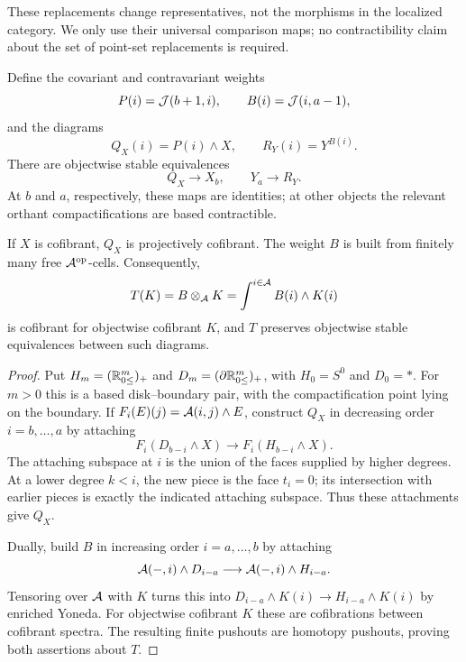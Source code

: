 These replacements change representatives, not the morphisms in the localized category. We only use their universal comparison maps; no contractibility claim about the set of point-set replacements is required.

Define the covariant and contravariant weights
\[
    P(i)=\mathcal{J}(b+1,i),\qquad B(i)=\mathcal{J}(i,a-1),
\]
and the diagrams
\[
    Q_X(i)=P(i)\wedge X,\qquad R_Y(i)=Y^{B(i)}.
\]
There are objectwise stable equivalences
\begin{equation}\label{eq:ChModels.endpoint_equivalences}
    Q_X\longrightarrow X_b,\qquad Y_a\longrightarrow R_Y.
\end{equation}
At $b$ and $a$, respectively, these maps are identities; at other objects the relevant orthant compactifications are based contractible.

\begin{lem}\label{lem:ChModels.cells}
    If $X$ is cofibrant, $Q_X$ is projectively cofibrant. The weight $B$ is built from finitely many free $\mathcal{A}^{\mathrm{op}}$-cells. Consequently,
    \[
        T(K)=B\otimes_{\mathcal{A}}K=\int^{i\in\mathcal{A}}B(i)\wedge K(i)
    \]
    is cofibrant for objectwise cofibrant $K$, and $T$ preserves objectwise stable equivalences between such diagrams.
\end{lem}
\begin{proof}
    Put $H_m=(\mathbb{R}_{0 \leq}^m)_+$ and $D_m=(\partial\mathbb{R}_{0 \leq}^m)_+$, with $H_0=S^0$ and $D_0=*$. For $m>0$ this is a based disk--boundary pair, with the compactification point lying on the boundary. If $F_i(E)(j)=\mathcal{A}(i,j)\wedge E$, construct $Q_X$ in decreasing order $i=b,\ldots,a$ by attaching
    \[
        F_i(D_{b-i}\wedge X)\longrightarrow F_i(H_{b-i}\wedge X).
    \]
    The attaching subspace at $i$ is the union of the faces supplied by higher degrees. At a lower degree $k<i$, the new piece is the face $t_i=0$; its intersection with earlier pieces is exactly the indicated attaching subspace. Thus these attachments give $Q_X$.

    Dually, build $B$ in increasing order $i=a,\ldots,b$ by attaching
    \[
        \mathcal{A}(-,i)\wedge D_{i-a}\longrightarrow
        \mathcal{A}(-,i)\wedge H_{i-a}.
    \]
    Tensoring over $\mathcal{A}$ with $K$ turns this into
    $D_{i-a}\wedge K(i)\to H_{i-a}\wedge K(i)$ by enriched Yoneda. For objectwise cofibrant $K$ these are cofibrations between cofibrant spectra. The resulting finite pushouts are homotopy pushouts, proving both assertions about $T$.
\end{proof}

